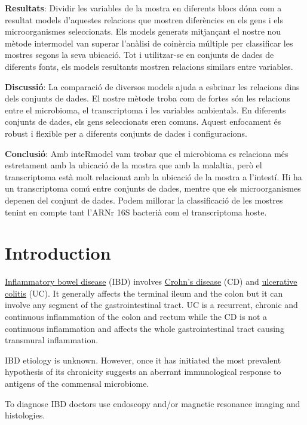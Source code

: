 \documentclass[
  12pt,
  a4paper,
  twoside,
  openright]{book}
\begin{document}
\textbf{Resultats}: Dividir les variables de la mostra en diferents blocs dóna com a resultat models d'aquestes relacions que mostren diferències en els gens i els microorganismes seleccionats.
Els models generats mitjançant el nostre nou mètode intermodel van superar l'anàlisi de coinèrcia múltiple per classificar les mostres segons la seva ubicació.
Tot i utilitzar-se en conjunts de dades de diferents fonts, els models resultants mostren relacions similars entre variables.

\textbf{Discussió}: La comparació de diversos models ajuda a esbrinar les relacions dins dels conjunts de dades.
El nostre mètode troba com de fortes són les relacions entre el microbioma, el transcriptoma i les variables ambientals.
En diferents conjunts de dades, els gens seleccionats eren comuns.
Aquest enfocament és robust i flexible per a diferents conjunts de dades i configuracions.

\textbf{Conclusió}: Amb inteRmodel vam trobar que el microbioma es relaciona més estretament amb la ubicació de la mostra que amb la malaltia, però el transcriptoma està molt relacionat amb la ubicació de la mostra a l'intestí.
Hi ha un transcriptoma comú entre conjunts de dades, mentre que els microorganismes depenen del conjunt de dades.
Podem millorar la classificació de les mostres tenint en compte tant l'ARNr 16S bacterià com el transcriptoma hoste.

\hypertarget{introduction}{%
\chapter{Introduction}\label{introduction}}

\href{https://en.wikipedia.org/wiki/Inflammatory_bowel_disease}{Inflammatory bowel disease} (IBD) involves \href{https://en.wikipedia.org/wiki/Crohn\%27s_disease}{Crohn's disease} (CD) and \href{https://en.wikipedia.org/wiki/Ulcerative_colitis}{ulcerative colitis} (UC).
It generally affects the terminal ileum and the colon but it can involve any segment of the gastrointestinal tract.
UC is a recurrent, chronic and continuous inflammation of the colon and rectum while the CD is not a continuous inflammation and affects the whole gastrointestinal tract causing transmural inflammation.

IBD etiology is unknown.
However, once it has initiated the most prevalent hypothesis of its chronicity suggests an aberrant immunological response to antigens of the commensal microbiome.

To diagnose IBD doctors use endoscopy and/or magnetic resonance imaging and histologies.
\end{document}
